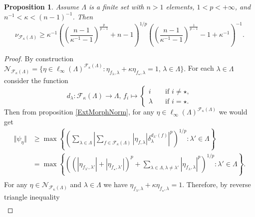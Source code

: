 \documentclass[12pt]{article}
\newtheorem{proposition}[theorem]{Proposition}
\begin{document}
\begin{proposition}\label{ExtMorphsNormLwrBnd}
    Assume $\Lambda$ is a finite set with $n > 1$ elements, $1 < p < +\infty$, 
    and $n^{-1} < \kappa < (n-1)^{-1}$. Then
    \[
        \nu_{\mathcal{F}_{\kappa}(\Lambda)}
        \geq 
        \kappa^{-1}
        \left(
            \left(\frac{n-1}{\kappa^{-1}-1}\right)^{\frac{p}{p-1}}+n-1
        \right)^{1/p}
        \left(
            \left(\frac{n-1}{\kappa^{-1}-1}\right)^{\frac{1}{p-1}}-1+\kappa^{-1}
        \right)^{-1}.
    \]
\end{proposition}
\begin{proof}
    By construction
    $
        \mathcal{N}_{\mathcal{F}_{\kappa}(\Lambda)}=\{
            \eta\in\ell_\infty(\Lambda)^{\mathcal{F}_{\kappa}(\Lambda)}:
            \eta_{f_\lambda,\lambda}+\kappa \eta_{f_\star, \lambda}=1,\, 
            \lambda\in\Lambda
        \}.
    $
    For each $\lambda\in\Lambda$ consider the function
    \[
        d_\lambda:\mathcal{F}_\kappa(\Lambda)\to\Lambda,\,
        f_i\mapsto
        \begin{cases}
            i\quad &\text{if } i\neq \star,\\
            \lambda\quad &\text{if } i=\star.
        \end{cases}
    \]
    Then from proposition \ref{ExtMorphNorm}, for 
    any $\eta\in\ell_\infty(\Lambda)^{\mathcal{F}_{\kappa}(\Lambda)}$ we 
    would get
    \[
    \begin{aligned}
        \Vert\psi_{\eta}\Vert
        &\geq\max\left\{
            \left(\sum_{\lambda\in\Lambda}
                \left|
                    \sum_{f\in\mathcal{F}_{\kappa}(\Lambda)} 
                        |\eta_{f,\lambda}|\delta_{\lambda}^{d_{\lambda'}(f)}
                \right|^p
            \right)^{1/p}:
            \lambda'\in\Lambda
        \right\} \\
        &=\max\left\{
            \left(
                (|\eta_{f_{\lambda'},\lambda'}|+|\eta_{f_\star,\lambda'}|)^p
                +
                \sum_{\lambda\in\Lambda,\lambda\neq \lambda'} 
                    |\eta_{f_\lambda,\lambda}|^p
            \right)^{1/p}:
            \lambda'\in\Lambda
        \right\}. \\
    \end{aligned}
    \]
    For any $\eta\in\mathcal{N}_{\mathcal{F}_{\kappa}(\Lambda)}$ 
    and $\lambda\in\Lambda$ we 
    have $\eta_{f_\lambda,\lambda}+\kappa \eta_{f_\star, \lambda}=1$. 
    Therefore, by reverse triangle inequality
    \[
    \begin{aligned}

\end{aligned}\]
\end{proof}
\end{document}
